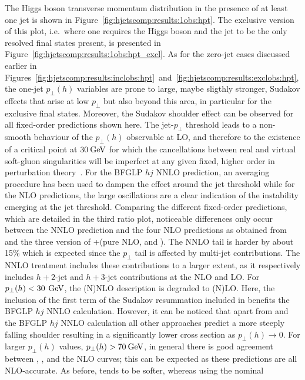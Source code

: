 The Higgs boson transverse momentum distribution in the presence of at
least one jet is shown in
Figure~\ref{fig:hjetscomp:results:1obs:hpt}. The exclusive version of
this plot, i.e.~where one requires the Higgs boson and the jet to be 
the only resolved final states present,
is presented in Figure~\ref{fig:hjetscomp:results:1obs:hpt_excl}.  As
for the zero-jet cases discussed earlier in
Figures~\ref{fig:hjetscomp:results:inclobs:hpt}~and~\ref{fig:hjetscomp:results:exclobs:hpt},
the one-jet $p_\perp(h)$ variables are prone to large, maybe sligthly
stronger, Sudakov effects that arise at low $p_\perp$ but also beyond
this area, in particular for the exclusive final states. Moreover, the
Sudakov shoulder effect can be observed for all fixed-order
predictions shown here. The jet-$p_\perp$ threshold leads to a
non-smooth behaviour of the $p_\perp(h)$ observable at LO, and
therefore to the existence of a critical point at $30\text{\:GeV}$ for which
the cancellations between real and virtual soft-gluon singularities
will be imperfect at any given fixed, higher order in perturbation
theory~\cite{Catani:1997xc}. For the BFGLP $hj$ NNLO  prediction, an
averaging procedure has been used to dampen the effect around the jet
threshold while for the NLO predictions, the large oscillations are a
clear indication of the instability emerging at the jet threshold.
Comparing the different fixed-order predictions, which are detailed in 
the third ratio plot, noticeable differences only
occur between the NNLO prediction and the four NLO predictions as
obtained from \Powheg and the three version of \GoSam{}+\Sherpa (pure
NLO, \Minlo and \Loopsim). The NNLO tail is harder by about 15\% which
is expected since the $p_\perp$ tail is affected by multi-jet
contributions. The NNLO treatment includes these contributions to a
larger extent, as it respectively includes $h+2$-jet and
$h+3$-jet contributions at the NLO and LO. For $p_\perp(h)< 30\,\text{\:GeV}$, 
the (N)NLO description is degraded to (N)LO. Here, the inclusion of 
the first term of the Sudakov resummation included in \Powheg benefits 
the BFGLP $hj$ NNLO calculation. However, it
can be noticed that apart from \Powheg and the BFGLP $hj$ NNLO
calculation all other approaches predict a more steeply falling
shoulder resulting in a significantly lower
cross section as $p_\perp(h)\to0$.
For larger $p_\perp(h)$ values, $p_\perp(h)>70\text{\:GeV}$, in general there
is good agreement between \Powheg, \MGaMC, \Sherpa and the NLO curves;
this can be expected as these predictions are all NLO-accurate. As
before, \Herwig tends to be softer, whereas \MGaMC using the nominal
